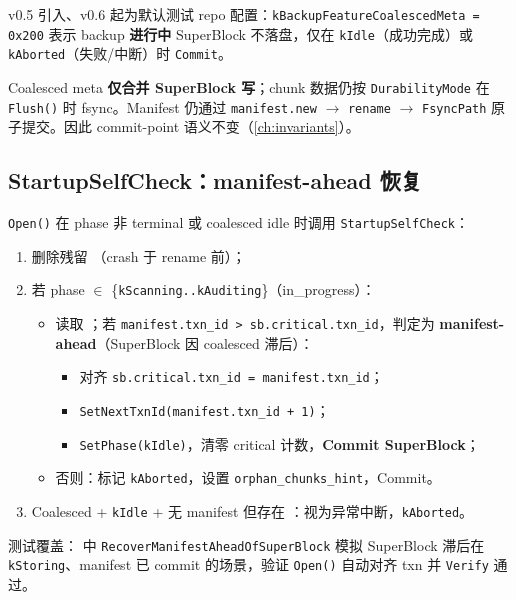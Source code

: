 v0.5  引入、v0.6 起为默认测试 repo 配置：\texttt{kBackupFeatureCoalescedMeta = 0x200} 表示 backup \textbf{进行中} SuperBlock 不落盘，仅在 \texttt{kIdle}（成功完成）或 \texttt{kAborted}（失败/中断）时 \texttt{Commit}。

\begin{invariantbox}[与 I-B2 正交]
Coalesced meta \textbf{仅合并 SuperBlock 写}；chunk 数据仍按 \texttt{DurabilityMode} 在 \texttt{Flush()} 时 fsync。Manifest 仍通过 \texttt{manifest.new} $\rightarrow$ \texttt{rename} $\rightarrow$ \texttt{FsyncPath} 原子提交。因此 commit-point 语义不变（\cref{ch:invariants}）。
\end{invariantbox}

\subsection{StartupSelfCheck：manifest-ahead 恢复}

\texttt{Open()} 在 phase 非 terminal 或 coalesced idle 时调用 \texttt{StartupSelfCheck}：

\begin{enumerate}[nosep]
  \item 删除残留 （crash 于 rename 前）；
  \item 若 phase $\in$ \{\texttt{kScanning..kAuditing}\}（in\_progress）：
  \begin{itemize}[nosep]
    \item 读取 ；若 \texttt{manifest.txn\_id > sb.critical.txn\_id}，判定为 \textbf{manifest-ahead}（SuperBlock 因 coalesced 滞后）：
    \begin{itemize}[nosep]
      \item 对齐 \texttt{sb.critical.txn\_id = manifest.txn\_id}；
      \item \texttt{SetNextTxnId(manifest.txn\_id + 1)}；
      \item \texttt{SetPhase(kIdle)}，清零 critical 计数，\textbf{Commit SuperBlock}；
    \end{itemize}
    \item 否则：标记 \texttt{kAborted}，设置 \texttt{orphan\_chunks\_hint}，Commit。
  \end{itemize}
  \item Coalesced + \texttt{kIdle} + 无 manifest 但存在 ：视为异常中断，\texttt{kAborted}。
\end{enumerate}

测试覆盖： 中 \texttt{RecoverManifestAheadOfSuperBlock} 模拟 SuperBlock 滞后在 \texttt{kStoring}、manifest 已 commit 的场景，验证 \texttt{Open()} 自动对齐 txn 并 \texttt{Verify} 通过。

